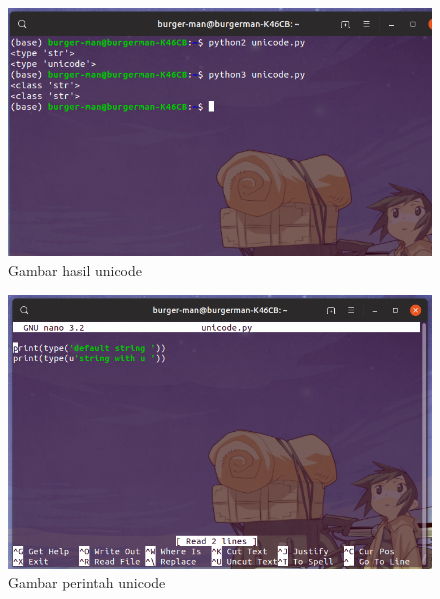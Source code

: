 \begin{enumerate}
\begin{figure}[H]
\centering
\includegraphics[width=1\textwidth]{figures/unicodeuni.png}
\caption{Gambar hasil unicode}
\label{unicodeuni}
\end{figure}

\begin{figure}[H]
\centering
\includegraphics[width=1\textwidth]{figures/unicodeuninano.png}
\caption{Gambar perintah unicode}
\label{unicodeuninano}
\end{figure}

\end{enumerate}